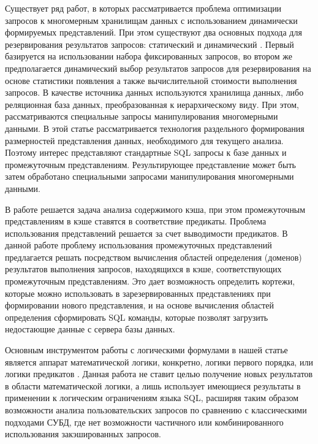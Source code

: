 \documentclass{cmi}
\begin{document}
Существует ряд работ, в которых рассматривается проблема оптимизации запросов к многомерным хранилищам данных с использованием динамически формируемых представлений. При этом существуют два основных подхода для резервирования результатов запросов: статический \cite{baralis, gupta97, gupta99} и динамический \cite{scheuermann, shim, kalnis, chang}. Первый базируется на использовании набора фиксированных запросов, во втором же предполагается динамический выбор результатов запросов  для резервирования на основе статистики появления а также вычислительной стоимости выполнения запросов. В качестве источника данных используются хранилища данных, либо реляционная база данных, преобразованная к иерархическому виду. При этом, рассматриваются специальные запросы манипулирования многомерными данными.  В этой статье рассматривается технология раздельного формирования размерностей представления данных, необходимого для текущего анализа. Поэтому интерес представляют стандартные SQL запросы к базе данных и промежуточным представлениям.  Результирующее представление может быть затем обработано специальными запросами манипулирования многомерными данными.

В работе \cite{keller} решается задача анализа содержимого кэша, при этом промежуточным представлениям в кэше ставятся в соответствие предикаты. Проблема использования представлений решается за счет выводимости предикатов. В данной работе проблему использования промежуточных представлений предлагается решать посредством вычисления областей определения (доменов) результатов выполнения запросов, находящихся в кэше, соответствующих промежуточным представлениям. Это дает возможность определить кортежи, которые можно использовать в зарезервированных представлениях при формировании нового представления, и на основе вычисления областей определения сформировать SQL команды, которые позволят загрузить недостающие данные с сервера базы данных.

Основным инструментом работы с логическими формулами в нашей статье является аппарат математической логики, конкретно, логики первого порядка, или логики предикатов \cite{hilbert, mendelson, church}. Данная работа не ставит
целью получение новых результатов в области математической логики, а лишь использует имеющиеся результаты в
применении к логическим ограничениям языка SQL, расширяя таким образом возможности анализа пользовательских
запросов по сравнению с классическими подходами СУБД, где нет возможности частичного или комбинированного
использования закэшированных запросов.
\end{document}

